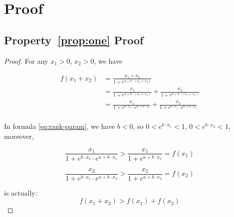 \section{Proof}
\label{sec:appendix_proof}
\subsection{Property~\ref{prop:one} Proof}
\begin{proof}
\label{proof:one}
For any $x_1>0$, $x_2>0$, we have

\[
\begin{aligned}
f(x_1+x_2)&=\frac{x_1+x_2}{1+e^{a+b\cdot (x_1+x_2)}}\\
&=\frac{x_1}{1+e^{a+b\cdot (x_1+x_2)}}+\frac{x_2}{1+e^{a+b\cdot (x_1+x_2)}}\\
&=\frac{x_1}{1+e^{b\cdot x_2}\cdot e^{a+b\cdot {x_1}}}+\frac{x_2}{1+e^{b\cdot x_1}\cdot e^{a+b\cdot {x_2}}}\\
\end{aligned}
\]

In formula \ref{eq:rank-param}, we have $b<0$, so $0<e^{b\cdot x_1}<1$, $0<e^{b\cdot x_2}<1$, moreover,

\[
\frac{x_1}{1+e^{b\cdot x_2}\cdot e^{a+b\cdot {x_1}}}>\frac{x_1}{1+ e^{a+b\cdot {x_1}}}=f(x_1)
\]

\[
\frac{x_2}{1+e^{b\cdot x_1}\cdot e^{a+b\cdot {x_2}}}>\frac{x_2}{1+ e^{a+b\cdot {x_2}}}=f(x_2)
\]

is actually:
\[
f(x_1+x_2)>f(x_1)+f(x_2)
\]
\end{proof}

